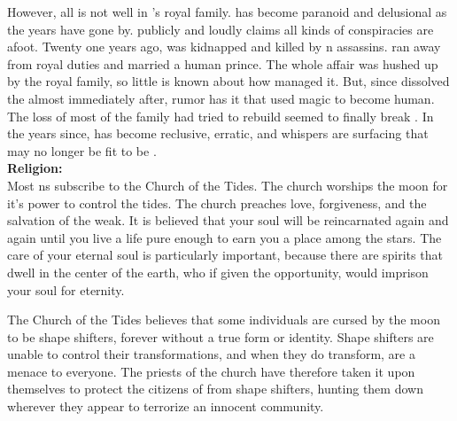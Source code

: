 \documentclass[blue]{NeptuneBall}
\begin{document}
However, all is not well in \pAtlantis{}'s royal family. \cPlant{\Prince} \cPlant{} has become paranoid and delusional as the years have gone by. \cPlant{\They} publicly and loudly claims all kinds of conspiracies are afoot. Twenty one years ago, \cQueen{\King} \cQueen{} was kidnapped and killed by \pPacifica{}n assassins. \cAriel{\Prince} \cAriel{} ran away from \cAriel{\their} royal duties and married a human prince. The whole affair was hushed up by the royal family, so little is known about how \cAriel{\they{}} managed it. But, since \cKing{} dissolved the \pMagician{} almost immediately after, rumor has it that \cAriel{\they} used magic to become human. The loss of most of the family \cKing{\they} had tried to rebuild seemed to finally break \cKing{\King} \cKing{}. In the years since, \cKing{\they{}} has become reclusive, erratic, and whispers are surfacing that \cKing{\they{}} may no longer be fit to be \cKing{\King}.\\

{\bf Religion:}\\
Most \pAtlantis{}ns subscribe to the Church of the Tides. The church worships the moon for it's power to control the tides. The church preaches love, forgiveness, and the salvation of the weak. It is believed that your soul will be reincarnated again and again until you live a life pure enough to earn you a place among the stars. The care of your eternal soul is particularly important, because there are spirits that dwell in the center of the earth, who if given the opportunity, would imprison your soul for eternity.

The Church of the Tides believes that some individuals are cursed by the moon to be shape shifters, forever without a true form or identity. Shape shifters are unable to control their transformations, and when they do transform, are a menace to everyone. The priests of the church have therefore taken it upon themselves to protect the citizens of \pAtlantis{} from shape shifters, hunting them down wherever they appear to terrorize an innocent community.\\
\end{document}
